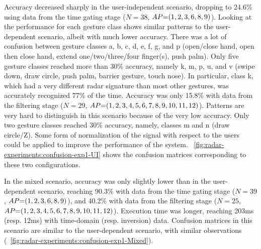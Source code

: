 Accuracy decreased sharply in the user-independent scenario, dropping to 24.6\% using data from the time gating stage ($N{=}38$, $\splitatcommas{AP{=}(1, 2, 3, 6, 8, 9)}$).
Looking at the performance for each gesture class shows similar patterns to the user-dependent scenario, albeit with much lower accuracy. There was a lot of confusion between gesture classes a, b, c, d, e, f, g, and p (open/close hand, open then close hand, extend one/two/three/four finger(s), push palm). Only five gesture classes reached more than 30\% accuracy, namely k, m, p, u, and v (swipe down, draw circle, push palm, barrier gesture, touch nose). In particular, class k, which had a very different radar signature than most other gestures, was accurately recognized 77\% of the time.
%
Accuracy was only 15.8\% with data from the filtering stage ($N{=}29$, $\splitatcommas{AP{=}(1, 2, 3, 4, 5, 6, 7, 8, 9, 10, 11, 12)}$). Patterns are very hard to distinguish in this scenario because of the very low accuracy. Only two gesture classes reached 30\% accuracy, namely, classes m and n (draw circle/Z). Some form of normalization of the signal with respect to the users could be applied to improve the performance of the system.
%
\fig~\ref{fig:radar-experiments:confusion-exp1-UI} shows the confusion matrices corresponding to these two configurations. 

In the mixed scenario, accuracy was only slightly lower than in the user-dependent scenario, reaching 90.3\% with data from the time gating stage ($N{=}39$, $\splitatcommas{AP{=}(1, 2, 3, 6, 8, 9)}$), and 40.2\% with data from the filtering stage ($N{=}25$, $\splitatcommas{AP{=}(1, 2, 3, 4, 5, 6, 7, 8, 9, 10, 11, 12)}$). Execution time was longer, reaching 203ms (resp. 12ms) with time-domain (resp. inversion) data.
Confusion matrices in this scenario are similar to the user-dependent scenario, with similar observations (\fig~\ref{fig:radar-experiments:confusion-exp1-Mixed}).

